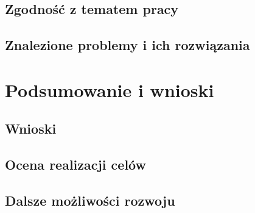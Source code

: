 \documentclass[12pt, a4paper, oneside]{report}
\begin{document}
\section{Zgodność z tematem pracy}
\label{sec:zgodnosc}



\section{Znalezione problemy i ich rozwiązania}
\label{sec:problemy}



\chapter{Podsumowanie i wnioski}
\label{chap:podsumowanie}


\section{Wnioski}
\label{sec:wnioski}



\section{Ocena realizacji celów}
\label{sec:ocena}



\section{Dalsze możliwości rozwoju}
\label{sec:rozwoj}




\end{document}
